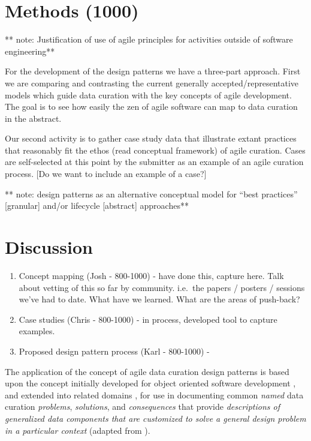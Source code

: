 \documentclass[paper]{ijdc-v9}
\begin{document}
\section{Methods (1000)}\label{methods-1000}

** note: Justification of use of agile principles for activities outside
of software engineering**

For the development of the design patterns we have a three-part
approach. First we are comparing and contrasting the current generally
accepted/representative models which guide data curation with the key
concepts of agile development. The goal is to see how easily the zen of
agile software can map to data curation in the abstract.

Our second activity is to gather case study data that illustrate extant
practices that reasonably fit the ethos (read conceptual framework) of
agile curation. Cases are self-selected at this point by the submitter
as an example of an agile curation process. {[}Do we want to include an
example of a case?{]}

** note: design patterns as an alternative conceptual model for ``best
practices'' {[}granular{]} and/or lifecycle {[}abstract{]} approaches**

\section{Discussion}\label{discussion}

\begin{enumerate}
\def\labelenumi{\arabic{enumi}.}
\item
  Concept mapping (Josh - 800-1000) - have done this, capture here. Talk
  about vetting of this so far by community. i.e.~the papers / posters /
  sessions we've had to date. What have we learned. What are the areas
  of push-back?
\item
  Case studies (Chris - 800-1000) - in process, developed tool to
  capture examples.
\item
  Proposed design pattern process (Karl - 800-1000) -
\end{enumerate}

The application of the concept of agile data curation design patterns is
based upon the concept initially developed for object oriented software
development \autocite{gamma_design_1995}, and extended into related
domains
\autocites{daigneau_service_2011}{lasater_design_2010}{ackerman_patterns-based_2010}{schwinn_design_2005}{hohpe_enterprise_2003},
for use in documenting common \emph{named} data curation
\emph{problems}, \emph{solutions}, and \emph{consequences} that provide
\emph{descriptions of generalized data components that are customized to
solve a general design problem in a particular context} (adapted from
\autocite[section 1.1]{gamma_design_1995}).
\end{document}
